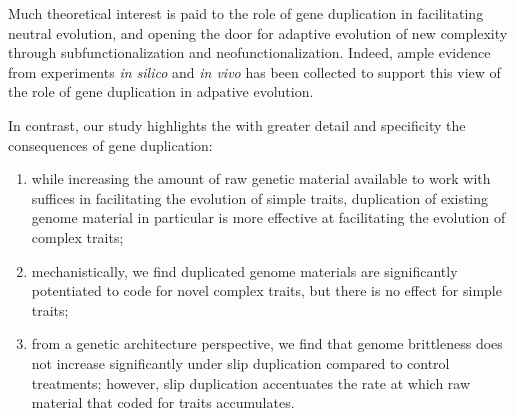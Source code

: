 Much theoretical interest is paid to the role of gene duplication in facilitating neutral evolution, and opening the door for adaptive evolution of new complexity through subfunctionalization and neofunctionalization.
Indeed, ample evidence from experiments \textit{in silico} and \textit{in vivo} has been collected to support this view of the role of gene duplication in adpative evolution.

In contrast, our study highlights the with greater detail and specificity the consequences of gene duplication:
\begin{enumerate}
\item while increasing the amount of raw genetic material available to work with suffices in facilitating the evolution of simple traits, duplication of existing genome material in particular is more effective at facilitating the evolution of complex traits;
\item mechanistically, we find duplicated genome materials are significantly potentiated to code for novel complex traits, but there is no effect for simple traits;
\item from a genetic architecture perspective, we find that genome brittleness does not increase significantly under slip duplication compared to control treatments; however, slip duplication accentuates the rate at which raw material that coded for traits accumulates.
\end{enumerate}


